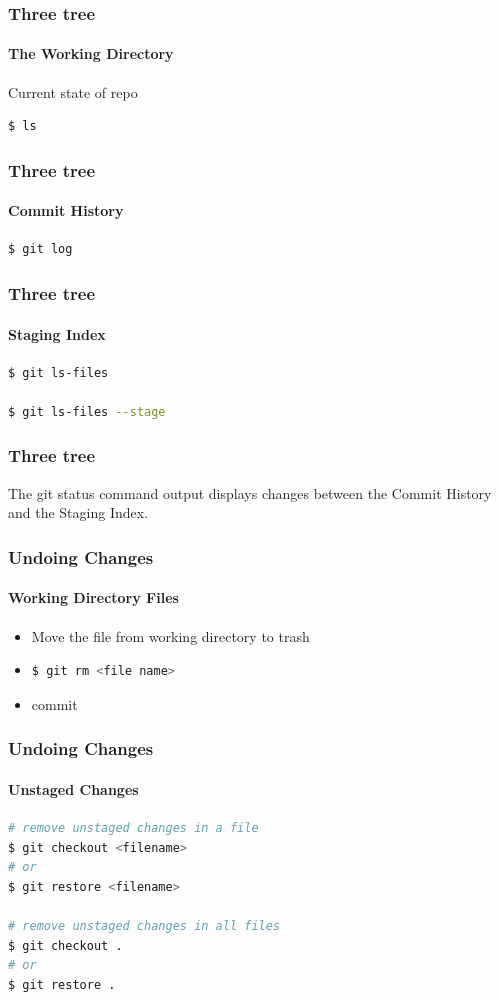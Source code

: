 \documentclass{beamer}
\begin{document}
	\begin{frame}[fragile]
	\frametitle{Three tree}
	\framesubtitle{The Working Directory}
	
	Current state of repo
\begin{lstlisting}[language=bash]
$ ls
\end{lstlisting}	
	\end{frame}
	
	\begin{frame}[fragile]
	\frametitle{Three tree}
	\framesubtitle{Commit History}
	
\begin{lstlisting}[language=bash]
$ git log
\end{lstlisting}	
	\end{frame}
	
	\begin{frame}[fragile]
	\frametitle{Three tree}
	\framesubtitle{Staging Index}
	
\begin{lstlisting}[language=bash]
$ git ls-files

$ git ls-files --stage
\end{lstlisting}	
	\end{frame}
	
	\begin{frame}[fragile]
	\frametitle{Three tree}
	The git \textcolor{secondary}{status command} output displays changes between the Commit History and the Staging Index.
	\end{frame}
	
	\begin{frame}[fragile]
		\frametitle{Undoing Changes}
		\framesubtitle{Working Directory Files}
		
		\begin{itemize}
			\item Move the file from working directory to trash
			\item 
\begin{lstlisting}[language=bash]
$ git rm <file name>
\end{lstlisting}
			\item commit
		\end{itemize}
	\end{frame}
	
	\begin{frame}[fragile]
		\frametitle{Undoing Changes}
		\framesubtitle{Unstaged Changes}
		
\begin{lstlisting}[language=bash]
# remove unstaged changes in a file
$ git checkout <filename>
# or
$ git restore <filename>

# remove unstaged changes in all files
$ git checkout .
# or
$ git restore .
\end{lstlisting}
	\end{frame}
\end{document}
